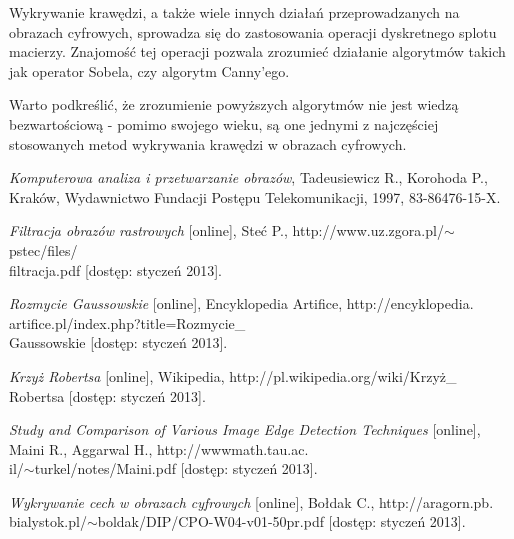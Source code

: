 \documentclass[a4paper,twocolumn,12pt]{article}
\begin{document}
Wykrywanie krawędzi, a także wiele innych działań przeprowadzanych na obrazach cyfrowych, sprowadza się do zastosowania operacji dyskretnego splotu macierzy.
Znajomość tej operacji pozwala zrozumieć działanie algorytmów takich jak operator Sobela, czy algorytm Canny'ego.

Warto podkreślić, że zrozumienie powyższych algorytmów nie jest wiedzą bezwartościową - pomimo swojego wieku, są one jednymi z najczęściej stosowanych metod wykrywania krawędzi w obrazach cyfrowych.



\begin{thebibliography}{9}
 \small
 
  \emph{Komputerowa analiza i przetwarzanie obrazów},
  Tadeusiewicz R., Korohoda P.,
  Kraków,
  Wydawnictwo Fundacji Postępu Telekomunikacji,
  1997,
  83-86476-15-X.
 
  \emph{Filtracja obrazów rastrowych} [online],
  Steć P.,
  http://www.uz.zgora.pl/$\sim$pstec/files/\\filtracja.pdf [dostęp: styczeń 2013].
 
  \emph{Rozmycie Gaussowskie} [online],
  Encyklopedia Artifice,
  http://encyklopedia.\\artifice.pl/index.php?title=Rozmycie\_\\Gaussowskie [dostęp: styczeń 2013].
 
  \emph{Krzyż Robertsa} [online],
  Wikipedia,
  http://pl.wikipedia.org/wiki/Krzyż\_\\Robertsa [dostęp: styczeń 2013].
 
  \emph{Study and Comparison of Various Image Edge Detection Techniques} [online],
  Maini R., Aggarwal H.,
  http://wwwmath.tau.ac.\\il/$\sim$turkel/notes/Maini.pdf [dostęp: styczeń 2013].
 
  \emph{Wykrywanie cech w obrazach cyfrowych} [online],
  Bołdak C.,
  http://aragorn.pb.\\bialystok.pl/$\sim$boldak/DIP/CPO-W04-v01-50pr.pdf [dostęp: styczeń 2013].
  
\end{thebibliography}
\end{document}
